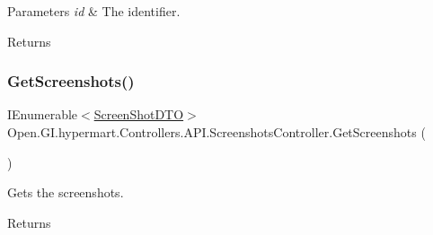 \begin{DoxyParams}{Parameters}
{\em id} & The identifier.\\
\hline
\end{DoxyParams}
\begin{DoxyReturn}{Returns}

\end{DoxyReturn}
\hypertarget{class_open_1_1_g_i_1_1hypermart_1_1_controllers_1_1_a_p_i_1_1_screenshots_controller_a59d05cd470e6721699f0234f99c9a213}{}\label{class_open_1_1_g_i_1_1hypermart_1_1_controllers_1_1_a_p_i_1_1_screenshots_controller_a59d05cd470e6721699f0234f99c9a213} 
\subsubsection{\texorpdfstring{Get\+Screenshots()}{GetScreenshots()}}
{\footnotesize\ttfamily I\+Enumerable$<$\hyperlink{class_open_1_1_g_i_1_1hypermart_1_1_docs_1_1_data_transformation_objects_1_1_screen_shot_d_t_o}{Screen\+Shot\+D\+TO}$>$ Open.\+G\+I.\+hypermart.\+Controllers.\+A\+P\+I.\+Screenshots\+Controller.\+Get\+Screenshots (\begin{DoxyParamCaption}{ }\end{DoxyParamCaption})}



Gets the screenshots. 

\begin{DoxyReturn}{Returns}

\end{DoxyReturn}
\hypertarget{class_open_1_1_g_i_1_1hypermart_1_1_controllers_1_1_a_p_i_1_1_screenshots_controller_a31b7e3814b2ea1fde97b28a76b6315db}{}\label{class_open_1_1_g_i_1_1hypermart_1_1_controllers_1_1_a_p_i_1_1_screenshots_controller_a31b7e3814b2ea1fde97b28a76b6315db} 
